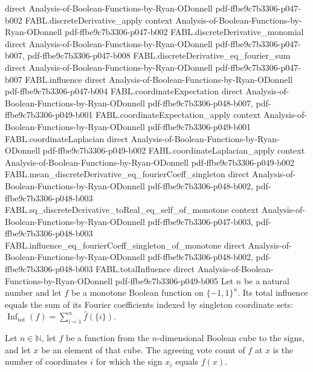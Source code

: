 \begin{theorem}
  {direct}
  {Analysis-of-Boolean-Functions-by-Ryan-ODonnell}
  {pdf-ffbe9c7b3306-p047-b002}
\proofstep
  {FABL.discreteDerivative_apply}
  {context}
  {Analysis-of-Boolean-Functions-by-Ryan-ODonnell}
  {pdf-ffbe9c7b3306-p047-b002}
\proofstep
  {FABL.discreteDerivative_monomial}
  {direct}
  {Analysis-of-Boolean-Functions-by-Ryan-ODonnell}
  {pdf-ffbe9c7b3306-p047-b007,
    pdf-ffbe9c7b3306-p047-b008}
\proofstep
  {FABL.discreteDerivative_eq_fourier_sum}
  {direct}
  {Analysis-of-Boolean-Functions-by-Ryan-ODonnell}
  {pdf-ffbe9c7b3306-p047-b007}
\proofstep
  {FABL.influence}
  {direct}
  {Analysis-of-Boolean-Functions-by-Ryan-ODonnell}
  {pdf-ffbe9c7b3306-p047-b004}
\proofstep
  {FABL.coordinateExpectation}
  {direct}
  {Analysis-of-Boolean-Functions-by-Ryan-ODonnell}
  {pdf-ffbe9c7b3306-p048-b007,
    pdf-ffbe9c7b3306-p049-b001}
\proofstep
  {FABL.coordinateExpectation_apply}
  {context}
  {Analysis-of-Boolean-Functions-by-Ryan-ODonnell}
  {pdf-ffbe9c7b3306-p049-b001}
\proofstep
  {FABL.coordinateLaplacian}
  {direct}
  {Analysis-of-Boolean-Functions-by-Ryan-ODonnell}
  {pdf-ffbe9c7b3306-p049-b002}
\proofstep
  {FABL.coordinateLaplacian_apply}
  {context}
  {Analysis-of-Boolean-Functions-by-Ryan-ODonnell}
  {pdf-ffbe9c7b3306-p049-b002}
\proofstep
  {FABL.mean_discreteDerivative_eq_fourierCoeff_singleton}
  {direct}
  {Analysis-of-Boolean-Functions-by-Ryan-ODonnell}
  {pdf-ffbe9c7b3306-p048-b002,
    pdf-ffbe9c7b3306-p048-b003}
\proofstep
  {FABL.sq_discreteDerivative_toReal_eq_self_of_monotone}
  {context}
  {Analysis-of-Boolean-Functions-by-Ryan-ODonnell}
  {pdf-ffbe9c7b3306-p047-b003,
    pdf-ffbe9c7b3306-p048-b003}
\proofstep
  {FABL.influence_eq_fourierCoeff_singleton_of_monotone}
  {direct}
  {Analysis-of-Boolean-Functions-by-Ryan-ODonnell}
  {pdf-ffbe9c7b3306-p048-b002,
    pdf-ffbe9c7b3306-p048-b003}
\proofstep
  {FABL.totalInfluence}
  {direct}
  {Analysis-of-Boolean-Functions-by-Ryan-ODonnell}
  {pdf-ffbe9c7b3306-p049-b005}
Let $n$ be a natural number and let $f$ be a monotone Boolean function on
$\{-1,1\}^n$. Its total influence equals the sum of its Fourier coefficients indexed
by singleton coordinate sets: $\operatorname{Inf}_{\mathrm{tot}}(f)=\sum_{i=1}^n
\widehat f(\{i\})$.
\end{theorem}

\begin{definition}
\label{FABL.agreeingVoteCount}
\leanok
{}
Let $n\in\mathbb N$, let $f$ be a function from the $n$-dimensional Boolean cube to the
signs, and let $x$ be an element of that cube. The agreeing vote count of $f$ at $x$ is
the number of coordinates $i$ for which the sign $x_i$ equals $f(x)$.
\end{definition}

